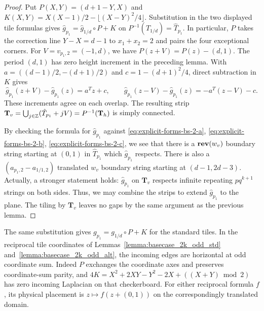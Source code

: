 \documentclass[12pt]{amsart}
\begin{document}
\begin{proof}
	Put $P(X,Y)=(d+1-Y,X)$ and $K(X,Y)=X(X-1)/2-\lfloor (X-Y)^2/4\rfloor$.
	Substitution in the two displayed tile formulas gives $\hat g_{p_1}=\hat g_{1/d}\circ P+K$ on $P^{-1}(\hat T_{1/d})=\hat T_{p_1}$.
	In particular, $P$ takes the correction line $Y-X=d-1$ to $x_1+x_2=2$ and pairs the four exceptional corners.
	For $V=v_{p_1,2}=(-1,d)$, we have $P(z+V)=P(z)-(d,1)$. The period $(d,1)$ has zero height increment in the preceding lemma.
	With $a=((d-1)/2,-(d+1)/2)$ and $c=1-(d+1)^2/4$, direct subtraction in $K$ gives
	\[
	\hat g_{p_1}(z+V)-\hat g_{p_1}(z)=a^Tz+c,\qquad
	\hat g_{p_1}(z-V)-\hat g_{p_1}(z)=-a^T(z-V)-c.
	\]
	These increments agree on each overlap. The resulting strip $\mathbf T_v=\bigcup_{j\in\mathbb{Z}}(\hat T_{p_1}+jV)=P^{-1}(\mathbf T_h)$ is simply connected.

	By checking the formula for $\hat{g}_{p_1}$ against \eqref{eq:explicit-forms-bs-2-a}, \eqref{eq:explicit-forms-bs-2-b}, \eqref{eq:explicit-forms-bs-2-c},
	we see that there is a $\mathop{\bf rev}(w_v)$ boundary string starting at $(0,1)$ in $\hat{T}_{p_1}$ which $\hat{g}_{p_1}$ respects. 
	There is also a $(a_{p_1,2} - a_{1/1,2})$ translated $w_v$ boundary string starting at $(d-1, 2d-3)$. 
	Actually, a stronger statement holds: $\hat{g}_{p_1}$ on $\mathbf{T}_v$ respects infinite repeating $p q^{k+1}$ strings on both sides. Thus, we may combine the strips to extend $\hat{g}_{p_1}$ to the plane. The tiling by $\mathbf{T}_v$ leaves no gaps by the same argument as the previous lemma. 	
\end{proof}



The same substitution gives $g_{p_1}=g_{1/d}\circ P+K$ for the standard tiles. In the reciprocal tile coordinates of Lemmas~\ref{lemma:basecase_2k_odd_std} and~\ref{lemma:basecase_2k_odd_alt}, the incoming edges are horizontal at odd coordinate sum. Indeed $P$ exchanges the coordinate axes and preserves coordinate-sum parity, and $4K=X^2+2XY-Y^2-2X+((X+Y)\bmod 2)$ has zero incoming Laplacian on that checkerboard. For either reciprocal formula $f$, its physical placement is $z\mapsto f(z+(0,1))$ on the correspondingly translated domain.
\end{document}
